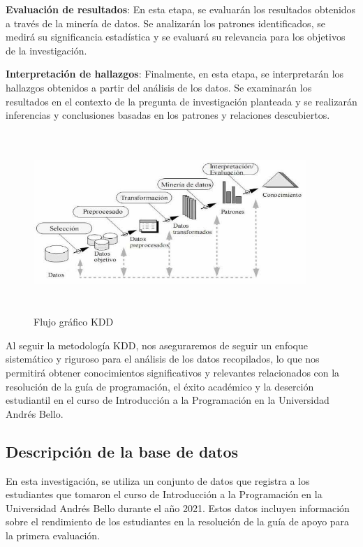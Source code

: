 \textbf{Evaluación de resultados}: En esta etapa, se evaluarán los resultados obtenidos a través de la minería de datos. Se analizarán los patrones identificados, se medirá su significancia estadística y se evaluará su relevancia para los objetivos de la investigación.

\textbf{Interpretación de hallazgos}: Finalmente, en esta etapa, se interpretarán los hallazgos obtenidos a partir del análisis de los datos. Se examinarán los resultados en el contexto de la pregunta de investigación planteada y se realizarán inferencias y conclusiones basadas en los patrones y relaciones descubiertos.

\begin{figure}[H]
  \centering
  \includegraphics[width=4.06111in,height=2.68611in]{img/KDD.png}
  \caption{Flujo gráfico KDD}
  \label{fig:flujo_kdd}
\end{figure}

Al seguir la metodología KDD, nos aseguraremos de seguir un enfoque sistemático y riguroso para el análisis de los datos recopilados, lo que nos permitirá obtener conocimientos significativos y relevantes relacionados con la resolución de la guía de programación, el éxito académico y la deserción estudiantil en el curso de Introducción a la Programación en la Universidad Andrés Bello.


\subsection{Descripción de la base de datos}

En esta investigación, se utiliza un conjunto de datos que registra a los estudiantes que tomaron el
curso de Introducción a la Programación en la Universidad Andrés Bello durante el año 2021.
Estos datos incluyen información sobre el rendimiento de los estudiantes en la resolución de la guía de apoyo para la primera evaluación.

